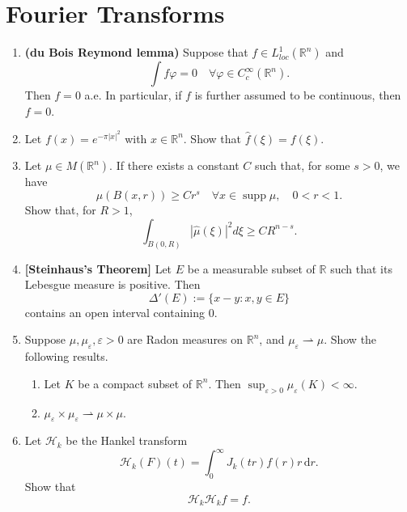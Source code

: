 \section{Fourier Transforms}
\begin{enumerate}[label=\arabic*.]
    \item \textbf{(du Bois Reymond lemma)} Suppose that $f \in L^1_{loc}(\mathbb{R}^n)$ and
    \begin{equation}
        \int f \varphi = 0 \quad \forall \varphi \in C^\infty_c(\mathbb{R}^n).
    \end{equation}
    Then $f = 0$ a.e. In particular, if $f$ is further assumed to be continuous, then $f = 0$.

    \item Let $f(x) = e^{-\pi|x|^2}$ with $x \in \mathbb{R}^n$. Show that $\widehat{f}(\xi) = f(\xi)$.

    \item Let $\mu \in M(\mathbb{R}^n)$. If there exists a constant $C$ such that, for some $s > 0$, we have
    \[
        \mu(B(x,r)) \ge C r^s \quad \forall x \in \operatorname{supp} \mu, \quad 0 < r < 1.
    \]
    Show that, for $R > 1$,
    \[
        \int_{B(0,R)} |\widehat{\mu}(\xi)|^2 d\xi \ge C R^{n-s}.
    \]

    \item \textbf{[Steinhaus’s Theorem]} Let $E$ be a measurable subset of $\mathbb{R}$ such that its Lebesgue measure is positive. Then
    \[
        \Delta'(E) := \{x-y : x,y \in E\}
    \]
    contains an open interval containing 0.

    \item Suppose $\mu, \mu_\varepsilon, \varepsilon > 0$ are Radon measures on $\mathbb{R}^n$, and $\mu_\varepsilon \rightharpoonup \mu$. Show the following results.
    \begin{enumerate}[label=(\roman*)]
        \item Let $K$ be a compact subset of $\mathbb{R}^n$. Then $\sup_{\varepsilon>0} \mu_\varepsilon(K) < \infty$.
        \item $\mu_\varepsilon \times \mu_\varepsilon \rightharpoonup \mu \times \mu$.
    \end{enumerate}

    \item Let $\mathcal{H}_k$ be the Hankel transform
    \[
        \mathcal{H}_k(F)(t)= \int_0^\infty J_k(tr)f(r)r\,\mathrm{d}r.
    \]
    Show that
    \[
        \mathcal{H}_k\mathcal{H}_k f=f.
    \]
\end{enumerate}


